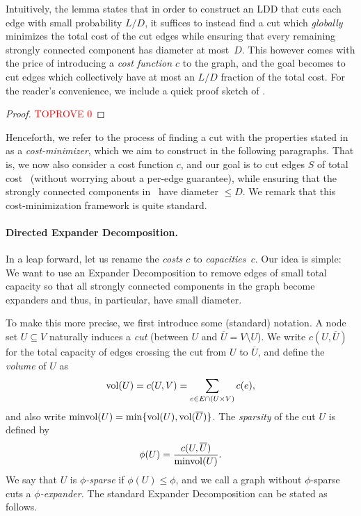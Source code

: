Intuitively, the lemma states that in order to construct an LDD that cuts each edge with small probability $L / D$, it suffices to instead find a cut which \emph{globally} minimizes the total cost of the cut edges while ensuring that every remaining strongly connected component has diameter at most~$D$. This however comes with the price of introducing a \emph{cost function $c$} to the graph, and the goal becomes to cut edges which collectively have at most an $L / D$ fraction of the total cost. For the reader's convenience, we include a quick proof sketch of .

\begin{proof}\textcolor{red}{TOPROVE 0}\end{proof}

Henceforth, we refer to the process of finding a cut with the properties stated in  as a \emph{cost-minimizer}, which we aim to construct in the following paragraphs. That is, we now also consider a cost function $c$, and our goal is to cut edges $S$ of total cost~ (without worrying about a per-edge guarantee), while ensuring that the strongly connected components in~ have diameter $\leq D$. We remark that this cost-minimization framework is quite standard.

\paragraph{Directed Expander Decomposition.}
In a leap forward, let us rename the \emph{costs $c$} to \emph{capacities~$c$}. Our idea is simple: We want to use an Expander Decomposition to remove edges of small total capacity so that all strongly connected components in the graph become expanders and thus, in particular, have small diameter.

To make this more precise, we first introduce some (standard) notation. A node set $U \subseteq V$ naturally induces a \emph{cut} (between $U$ and $\overline U = V \setminus U$). We write $c(U, \overline U)$ for the total capacity of edges crossing the cut from $U$ to $\overline U$, and define the \emph{volume} of $U$ as
\begin{equation*}
	\operatorname{vol}(U) = c(U, V) = \sum_{e \in E \cap (U \times V)} c(e),
\end{equation*}
and also write $\operatorname{minvol}(U) = \min\lbrace\operatorname{vol}(U), \operatorname{vol}(\overline U)\rbrace$. The \emph{sparsity} of the cut $U$ is defined by
\begin{equation*}
	\phi(U) = \frac{c(U, \overline U)}{\operatorname{minvol}(U)}.
\end{equation*}
We say that $U$ is \emph{$\phi$-sparse} if $\phi(U) \leq \phi$, and we call a graph without $\phi$-sparse cuts a \emph{$\phi$-expander.} The standard Expander Decomposition can be stated as follows.

